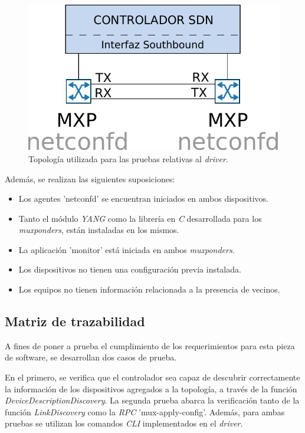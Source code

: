 \begin{figure}[!h]
	\centering
	\includegraphics[scale=0.8]{Figures/topologiatestdriver.pdf}
	\caption{Topología utilizada para las pruebas relativas al \textit{driver}.}
	\label{fig:test_topo_driver}
  \end{figure}


  Además, se realizan las siguientes suposiciones:

\begin{itemize}
	\item Los agentes 'netconfd' se encuentran iniciados en ambos dispositivos.
    \item Tanto el módulo \textit{YANG} como la librería en \textit{C} desarrollada para los \textit{muxponders}, están instaladas en los mismos.
    \item La aplicación 'monitor' está iniciada en ambos \textit{muxponders}.
    \item Los dispositivos no tienen una configuración previa instalada. 
    \item Los equipos no tienen información relacionada a la presencia de vecinos.
\end{itemize}

\subsection{Matriz de trazabilidad}

A fines de poner a prueba el cumplimiento de los requerimientos para esta pieza de software, se desarrollan dos casos de prueba. 

En el primero, se verifica que el controlador sea capaz de descubrir correctamente la información de los dispositivos agregados a la topología, a través de la función \textit{DeviceDescriptionDiscovery}. La segunda prueba abarca la verificación tanto de la función \textit{LinkDiscovery} como la  \textit{RPC} 'mux-apply-config'. Además, para ambas pruebas se utilizan los comandos \textit{CLI} implementados en el \textit{driver}.

